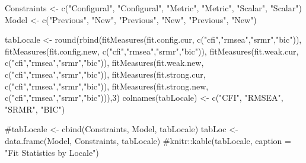\documentclass[
  letterpaper,
  DIV=11,
  numbers=noendperiod]{scrartcl}
\newenvironment{Shaded}{\begin{snugshade}}{\end{snugshade}}
\newcommand{\CommentTok}[1]{\textcolor[rgb]{0.37,0.37,0.37}{#1}}
\newcommand{\DecValTok}[1]{\textcolor[rgb]{0.68,0.00,0.00}{#1}}
\newcommand{\FunctionTok}[1]{\textcolor[rgb]{0.28,0.35,0.67}{#1}}
\newcommand{\NormalTok}[1]{\textcolor[rgb]{0.00,0.23,0.31}{#1}}
\newcommand{\OtherTok}[1]{\textcolor[rgb]{0.00,0.23,0.31}{#1}}
\newcommand{\StringTok}[1]{\textcolor[rgb]{0.13,0.47,0.30}{#1}}
\begin{document}
\begin{Shaded}
\begin{Highlighting}[]
\NormalTok{Constraints }\OtherTok{\textless{}{-}} \FunctionTok{c}\NormalTok{(}\StringTok{"Configural"}\NormalTok{, }\StringTok{"Configural"}\NormalTok{, }\StringTok{"Metric"}\NormalTok{, }\StringTok{"Metric"}\NormalTok{, }\StringTok{"Scalar"}\NormalTok{, }\StringTok{"Scalar"}\NormalTok{)}
\NormalTok{Model }\OtherTok{\textless{}{-}} \FunctionTok{c}\NormalTok{(}\StringTok{"Previous"}\NormalTok{, }\StringTok{"New"}\NormalTok{, }\StringTok{"Previous"}\NormalTok{, }\StringTok{"New"}\NormalTok{, }\StringTok{"Previous"}\NormalTok{, }\StringTok{"New"}\NormalTok{)}

\NormalTok{tabLocale }\OtherTok{\textless{}{-}} \FunctionTok{round}\NormalTok{(}\FunctionTok{rbind}\NormalTok{(}\FunctionTok{fitMeasures}\NormalTok{(fit.config.cur, }\FunctionTok{c}\NormalTok{(}\StringTok{"cfi"}\NormalTok{,}\StringTok{"rmsea"}\NormalTok{,}\StringTok{"srmr"}\NormalTok{,}\StringTok{"bic"}\NormalTok{)),}
      \FunctionTok{fitMeasures}\NormalTok{(fit.config.new, }\FunctionTok{c}\NormalTok{(}\StringTok{"cfi"}\NormalTok{,}\StringTok{"rmsea"}\NormalTok{,}\StringTok{"srmr"}\NormalTok{,}\StringTok{"bic"}\NormalTok{)),}
      \FunctionTok{fitMeasures}\NormalTok{(fit.weak.cur, }\FunctionTok{c}\NormalTok{(}\StringTok{"cfi"}\NormalTok{,}\StringTok{"rmsea"}\NormalTok{,}\StringTok{"srmr"}\NormalTok{,}\StringTok{"bic"}\NormalTok{)),}
      \FunctionTok{fitMeasures}\NormalTok{(fit.weak.new, }\FunctionTok{c}\NormalTok{(}\StringTok{"cfi"}\NormalTok{,}\StringTok{"rmsea"}\NormalTok{,}\StringTok{"srmr"}\NormalTok{,}\StringTok{"bic"}\NormalTok{)),}
      \FunctionTok{fitMeasures}\NormalTok{(fit.strong.cur, }\FunctionTok{c}\NormalTok{(}\StringTok{"cfi"}\NormalTok{,}\StringTok{"rmsea"}\NormalTok{,}\StringTok{"srmr"}\NormalTok{,}\StringTok{"bic"}\NormalTok{)),}
      \FunctionTok{fitMeasures}\NormalTok{(fit.strong.new, }\FunctionTok{c}\NormalTok{(}\StringTok{"cfi"}\NormalTok{,}\StringTok{"rmsea"}\NormalTok{,}\StringTok{"srmr"}\NormalTok{,}\StringTok{"bic"}\NormalTok{))),}\DecValTok{3}\NormalTok{)}
\FunctionTok{colnames}\NormalTok{(tabLocale) }\OtherTok{\textless{}{-}} \FunctionTok{c}\NormalTok{(}\StringTok{"CFI"}\NormalTok{, }\StringTok{"RMSEA"}\NormalTok{, }\StringTok{"SRMR"}\NormalTok{, }\StringTok{"BIC"}\NormalTok{)}

\CommentTok{\#tabLocale \textless{}{-} cbind(Constraints, Model, tabLocale)}
\NormalTok{tabLoc }\OtherTok{\textless{}{-}} \FunctionTok{data.frame}\NormalTok{(Model, Constraints, tabLocale)}
\CommentTok{\#knitr::kable(tabLocale, caption = "Fit Statistics by Locale")}


\end{Highlighting}
\end{Shaded}
\end{document}

